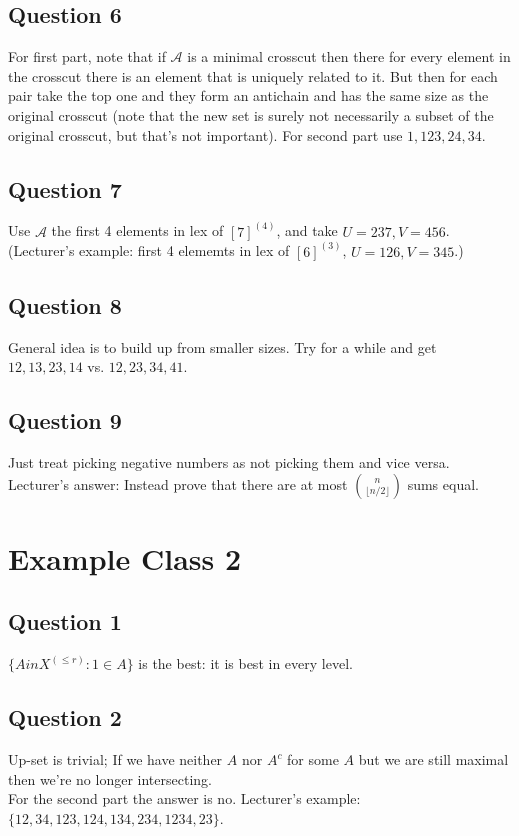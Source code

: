 \documentclass[a4paper]{article}
\begin{document}
\subsection{Question 6}
For first part, note that if $\mathcal{A}$ is a minimal crosscut then there for every element in the crosscut there is an element that is uniquely related to it. But then for each pair take the top one and they form an antichain and has the same size as the original crosscut (note that the new set is surely not necessarily a subset of the original crosscut, but that's not important).
For second part use $1,123,24,34$.

\subsection{Question 7}
Use $\mathcal{A}$ the first 4 elements in lex of $[7]^{(4)}$, and take $U=237, V=456$.\\
(Lecturer's example: first 4 elememts in lex of $[6]^{(3)}$, $U=126, V=345$.)

\subsection{Question 8}
General idea is to build up from smaller sizes. Try for a while and get $12,13,23,14$ vs. $12,23,34,41$.

\subsection{Question 9}
Just treat picking negative numbers as not picking them and vice versa.\\
Lecturer's answer: Instead prove that there are at most ${n \choose {\lfloor n/2 \rfloor}}$ sums equal.

\newpage

\section{Example Class 2}

\subsection{Question 1}
$\{A in X^{(\leq r)}:1 \in A\}$ is the best: it is best in every level.

\subsection{Question 2}
Up-set is trivial; If we have neither $A$ nor $A^c$ for some $A$ but we are still maximal then we're no longer intersecting.\\
For the second part the answer is no. Lecturer's example: $\{12,34,123,124,134,234,1234,23\}$.
\end{document}
